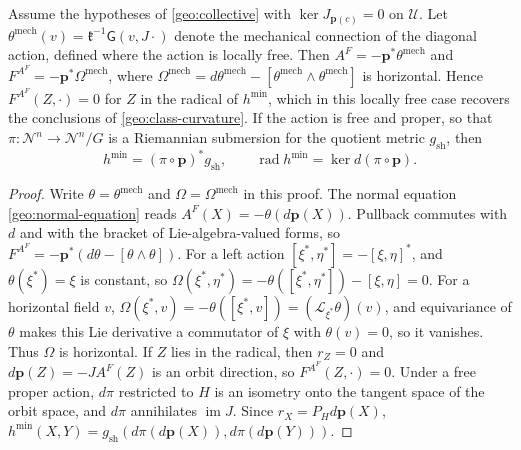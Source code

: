 Assume the hypotheses of \cref{geo:collective} with $\ker J_{\boldsymbol p(c)}=0$ on $\mathcal U$. Let $\theta^{\mathrm{mech}}(v)=\mathfrak k^{-1}\mathsf G(v,J\cdot)$ denote the mechanical connection of the diagonal action, defined where the action is locally free. Then $A^F=-\boldsymbol p^*\theta^{\mathrm{mech}}$ and $F^{A^F}=-\boldsymbol p^*\Omega^{\mathrm{mech}}$, where $\Omega^{\mathrm{mech}}=d\theta^{\mathrm{mech}}-[\theta^{\mathrm{mech}}\wedge\theta^{\mathrm{mech}}]$ is horizontal. Hence $F^{A^F}(Z,\cdot)=0$ for $Z$ in the radical of $h^{\min}$, which in this locally free case recovers the conclusions of \cref{geo:class-curvature}. If the action is free and proper, so that $\pi:\mathcal N^n\to\mathcal N^n/G$ is a Riemannian submersion for the quotient metric $g_{\mathrm{sh}}$, then
\begin{equation}
h^{\min}=(\pi\circ\boldsymbol p)^*g_{\mathrm{sh}},
\qquad
\operatorname{rad}h^{\min}=\ker d(\pi\circ\boldsymbol p).
\label{geo:shape-metric}
\end{equation}
\begin{proof}
Write $\theta=\theta^{\mathrm{mech}}$ and $\Omega=\Omega^{\mathrm{mech}}$ in this proof. The normal equation \cref{geo:normal-equation} reads $A^F(X)=-\theta(d\boldsymbol p(X))$. Pullback commutes with $d$ and with the bracket of Lie-algebra-valued forms, so $F^{A^F}=-\boldsymbol p^*(d\theta-[\theta\wedge\theta])$. For a left action $[\xi^*,\eta^*]=-[\xi,\eta]^*$, and $\theta(\xi^*)=\xi$ is constant, so $\Omega(\xi^*,\eta^*)=-\theta([\xi^*,\eta^*])-[\xi,\eta]=0$. For a horizontal field $v$, $\Omega(\xi^*,v)=-\theta([\xi^*,v])=(\mathcal L_{\xi^*}\theta)(v)$, and equivariance of $\theta$ makes this Lie derivative a commutator of $\xi$ with $\theta(v)=0$, so it vanishes. Thus $\Omega$ is horizontal. If $Z$ lies in the radical, then $r_Z=0$ and $d\boldsymbol p(Z)=-JA^F(Z)$ is an orbit direction, so $F^{A^F}(Z,\cdot)=0$. Under a free proper action, $d\pi$ restricted to $H$ is an isometry onto the tangent space of the orbit space, and $d\pi$ annihilates $\operatorname{im}J$. Since $r_X=P_Hd\boldsymbol p(X)$, $h^{\min}(X,Y)=g_{\mathrm{sh}}(d\pi(d\boldsymbol p(X)),d\pi(d\boldsymbol p(Y)))$.
\end{proof}

